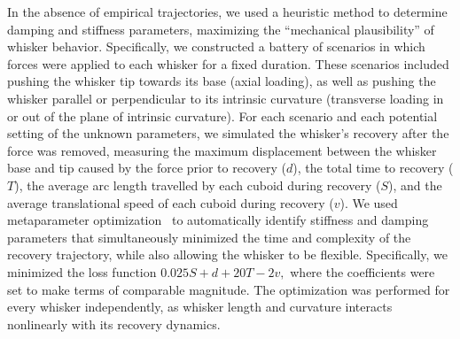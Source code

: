 In the absence of empirical trajectories, we used a heuristic method to determine damping and stiffness parameters, maximizing the ``mechanical plausibility'' of whisker behavior. 
Specifically, we constructed a battery of scenarios in which forces were applied to each whisker for a fixed duration.  These scenarios included pushing the whisker tip towards its base (axial loading), as well as pushing the whisker parallel or perpendicular to its intrinsic curvature (transverse loading in or out of the plane of intrinsic curvature).  
For each scenario and each potential setting of the unknown parameters, we simulated the whisker's recovery after the force was removed, measuring the maximum displacement between the whisker base and tip caused by the force prior to recovery ($d$), the total time to recovery ($T$), the average arc length travelled by each cuboid during recovery ($S$), and the average translational speed of each cuboid during recovery ($v$).    
We used metaparameter optimization~\cite{bergstra2013hyperopt} to automatically identify stiffness and damping parameters that simultaneously minimized the time and complexity of the recovery trajectory, while also allowing the whisker to be flexible.   
Specifically, we minimized the loss function $0.025S + d + 20T - 2v,$ where the coefficients were set to make terms of comparable magnitude.   
The optimization was performed for every whisker independently, as whisker length and curvature interacts nonlinearly with its recovery dynamics.   




